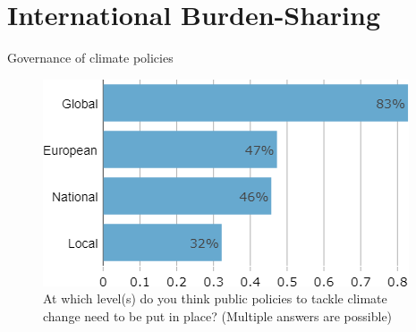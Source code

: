\documentclass[aspectratio=169,9pt,dvipsnames]{beamer}
\begin{document}
\section{International Burden-Sharing}


\begin{frame}{Governance of climate policies}%
\vspace{-1cm}
\begin{figure}[h!]
\centering
\caption{\small{At which level(s) do you think public policies to tackle climate change need to be put in place? (Multiple answers are possible)}}
\includegraphics[width=.5\textwidth]{../figures/DK/scale_DK.png}
\end{figure}
\end{frame}
\end{document}
